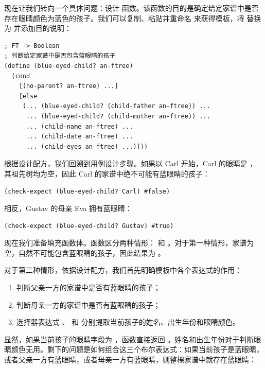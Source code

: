 现在让我们转向一个具体问题：设计  函数。该函数的目的是确定给定家谱中是否存在眼睛颜色为蓝色的孩子。我们可以复制、粘贴并重命名  来获得模板，将  替换为  并添加目的说明：

\begin{lstlisting}[language=BSL]
; FT -> Boolean
; 判断给定家谱中是否包含蓝眼睛的孩子
(define (blue-eyed-child? an-ftree)
  (cond
    [(no-parent? an-ftree) ...]
    [else
     (... (blue-eyed-child? (child-father an-ftree)) ...
      ... (blue-eyed-child? (child-mother an-ftree)) ...
      ... (child-name an-ftree) ...
      ... (child-date an-ftree) ...
      ... (child-eyes an-ftree) ...)]))
\end{lstlisting}

根据设计配方，我们回溯到用例设计步骤。如果以 Carl 开始，Carl 的眼睛是 ，其祖先树均为空，因此 Carl 的家谱中绝不可能有蓝眼睛的孩子：

\begin{lstlisting}[language=BSL]
(check-expect (blue-eyed-child? Carl) #false)
\end{lstlisting}

相反，Gustav 的母亲 Eva 拥有蓝眼睛：

\begin{lstlisting}[language=BSL]
(check-expect (blue-eyed-child? Gustav) #true)
\end{lstlisting}

现在我们准备填充函数体。函数区分两种情形： 和 。对于第一种情形，家谱为空，自然不可能包含蓝眼睛的孩子，因此结果为 。

对于第二种情形，依据设计配方，我们首先明确模板中各个表达式的作用：
\begin{enumerate}
  \item {} 判断父亲一方的家谱中是否有蓝眼睛的孩子；
  \item {} 判断母亲一方的家谱中是否有蓝眼睛的孩子；
  \item 选择器表达式 、 和  分别提取当前孩子的姓名、出生年份和眼睛颜色。
\end{enumerate}

显然，如果当前孩子的眼睛字段为 ，函数直接返回 。姓名和出生年份对于判断眼睛颜色无用。剩下的问题是如何组合这三个布尔表达式：如果当前孩子是蓝眼睛，或者父亲一方有蓝眼睛，或者母亲一方有蓝眼睛，则整棵家谱中就存在蓝眼睛：

